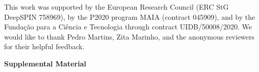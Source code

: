 \documentclass{article}
\newcommand{\andre}[1]{{\textcolor{blue}{\bf [{\sc Andre:} #1]}}}
\begin{document}
\begin{ack}
This work was supported by the European Research Council (ERC StG DeepSPIN 758969),
by the P2020 program MAIA (contract 045909), and by the Funda\c{c}\~ao para a Ci\^encia e Tecnologia 
through contract UIDB/50008/2020. 
We would like to thank Pedro Martins, Zita Marinho, and the anonymous reviewers for their helpful feedback.




\end{ack}







\newpage
\onecolumn

\appendix

\bigskip

\begin{center}
\LARGE{\bf Supplemental Material}
\end{center}


\begin{comment}
\section{Existence and Uniqueness of the Regularized Prediction Map}
\label{sec:appendix_existence}

We show here that the -RPM in \eqref{eq:reg_prediction} is well defined, i.e., the arg-max contains one and only one density.

The constraint set  is convex, because for any  and any , we have that . The first term in \eqref{eq:reg_prediction} is clearly continuous (thus also lower semi-continuous), since it is linear w.r.t. . For the same reason, it is concave (and also convex); in fact, for any , \andre{improve the writing here}

Since  is proper, a sufficient condition for the existence of maximizer(s) in \eqref{eq:reg_prediction} is thus that  is also proper \citep{Bauschke_Combettes2011}, \andre{point to section?} \textit{i.e.}, that  is never equal to , which is guaranteed by the definition of  in \eqref{eq:proper}.

Finally, since  is lower semi-continuous, proper, and convex, a sufficient condition for the uniqueness of the arg-max in \eqref{eq:reg_prediction} is that  be strictly convex, in addition to being convex and lower semi-continuous. \andre{improve the writing; R3 said: It seems to me that the proof can be constructed by saying that the expectation term varies linearly in p (and is bounded), and the regularizer is strictly convex (so (-regularizer) is strictly concave). Then Linear + Concave = Concave, and has a global maximum. It is good if you have rigorous proofs, but adding more accessible intuitions would increase the accessibility of the work.}
\end{comment}
\end{document}
